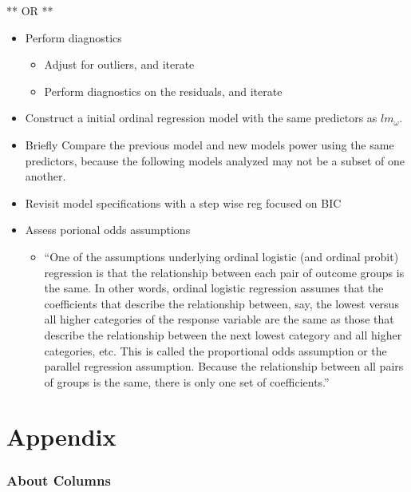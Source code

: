 \documentclass[]{article}
\providecommand{\tightlist}{%
  \setlength{\itemsep}{0pt}\setlength{\parskip}{0pt}}
\begin{document}
** OR **

\begin{itemize}
\tightlist
\item
  Perform diagnostics

  \begin{itemize}
  \tightlist
  \item
    Adjust for outliers, and iterate
  \item
    Perform diagnostics on the residuals, and iterate
  \end{itemize}
\item
  Construct a initial ordinal regression model with the same predictors
  as \(lm_\omega\).
\item
  Briefly Compare the previous model and new models power using the same
  predictors, because the following models analyzed may not be a subset
  of one another.
\item
  Revisit model specifications with a step wise reg focused on BIC
\item
  Assess porional odds assumptions

  \begin{itemize}
  \tightlist
  \item
    ``One of the assumptions underlying ordinal logistic (and ordinal
    probit) regression is that the relationship between each pair of
    outcome groups is the same. In other words, ordinal logistic
    regression assumes that the coefficients that describe the
    relationship between, say, the lowest versus all higher categories
    of the response variable are the same as those that describe the
    relationship between the next lowest category and all higher
    categories, etc. This is called the proportional odds assumption or
    the parallel regression assumption. Because the relationship between
    all pairs of groups is the same, there is only one set of
    coefficients.''
  \end{itemize}
\end{itemize}

\hypertarget{appendix}{%
\section{Appendix}\label{appendix}}

\hypertarget{about-columns}{%
\subsubsection{About Columns}\label{about-columns}}
\end{document}

